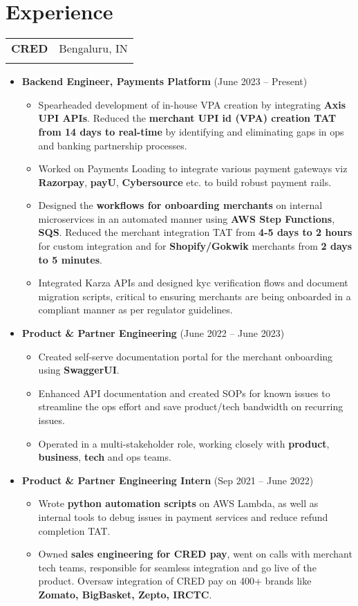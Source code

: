 \documentclass[letterpaper,11pt]{article}
\makeatletter
\newcommand{\resumeItem}[1]{
  \item\small{
    {#1 \vspace{-2pt}}
  }
}
\newcommand{\resumeSubheading}[4]{
  \vspace{-1pt}\item
    \begin{tabular*}{0.97\textwidth}[t]{l@{\extracolsep{\fill}}r}
      \textbf{#1} & #2 \\
      \textit{\small#3} & \textit{\small #4} \\
    \end{tabular*}\vspace{-5pt}
}
\newcommand{\resumeItemListStart}{\begin{itemize}}
\newcommand{\resumeItemListEnd}{\end{itemize}\vspace{-5pt}}
\makeatother
\begin{document}
\section{Experience}
    \resumeSubheading
      {CRED}{Bengaluru, IN}
      {}{}
      \resumeItemListStart
        \resumeItem{\textbf{Backend Engineer, Payments Platform} (June 2023 -- Present)}
        \resumeItemListStart
            \resumeItem{Spearheaded development of in-house VPA creation by integrating \textbf{Axis UPI APIs}. Reduced the \textbf{merchant UPI id (VPA) creation TAT from 14 days to real-time} by identifying and eliminating gaps in ops and banking partnership processes.}
            \resumeItem{Worked on Payments Loading to integrate various payment gateways viz \textbf{Razorpay}, 
            \textbf{payU}, \textbf{Cybersource} etc. to build robust payment rails.}
            \resumeItem{Designed the \textbf{workflows for onboarding merchants} on internal microservices in an automated manner using \textbf{AWS Step Functions}, \textbf{SQS}. Reduced the merchant integration TAT from \textbf{4-5 days to 2 hours} for custom integration and for \textbf{Shopify/Gokwik} merchants from \textbf{2 days to 5 minutes}.}
            \resumeItem{Integrated Karza APIs and designed kyc verification flows and document migration scripts, critical to ensuring merchants are being onboarded in a compliant manner as per regulator guidelines.}
        \resumeItemListEnd
        \resumeItem{\textbf{Product \& Partner Engineering} (June 2022 -- June 2023)}
         \resumeItemListStart
            \resumeItem{Created self-serve documentation portal for the merchant onboarding using \textbf{SwaggerUI}.}
            \resumeItem{Enhanced API documentation and created SOPs for known issues to streamline the ops effort and save product/tech bandwidth on recurring issues.}
            \resumeItem{Operated in a multi-stakeholder role, working closely with \textbf{product}, \textbf{business}, \textbf{tech} and ops teams.}
        \resumeItemListEnd
      
      \vspace{\baselineskip}
      \resumeItem{\textbf{Product \& Partner Engineering Intern} (Sep 2021 -- June 2022)}
         \resumeItemListStart
            \resumeItem{Wrote \textbf{python automation scripts} on AWS Lambda, as well as internal tools to debug issues in payment services and reduce refund completion TAT.}
            \resumeItem{Owned \textbf{sales engineering for CRED pay}, went on calls with merchant tech teams, responsible for seamless integration and go live of the product. Oversaw integration of CRED pay on 400+ brands like \textbf{Zomato, BigBasket, Zepto, IRCTC}.}
        \resumeItemListEnd
      \resumeItemListEnd
\end{document}
